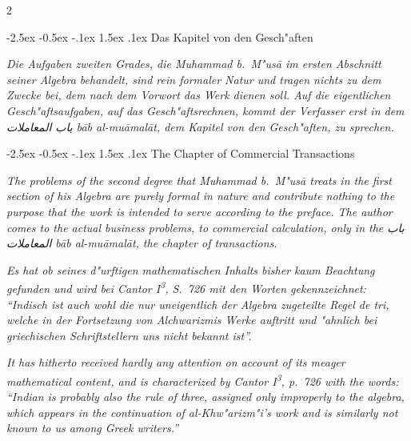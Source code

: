 \documentclass[10pt,a4paper]{article}
\makeatletter
\newcommand{\RL}[1]{\beginR#1\endR}
\newcommand{\ar}[1]{{\arabicfont\RL{#1}}}
\newcommand{\enquote}[1]{``#1''}
\renewcommand{\section}{\@startsection{section}{1}{\z@}%
  {-2.5ex \@plus -0.5ex \@minus -.1ex}%
  {1.5ex \@plus .1ex}%
  {\normalfont\large\bfseries\color{sectioncolor}}}
\makeatother
\begin{document}
\begin{paracol}{2}

\section{Das Kapitel von den Gesch"aften}

\textit{Die Aufgaben zweiten Grades, die Muhammad b.\ M"us\=a im ersten Abschnitt seiner Algebra behandelt, sind rein formaler Natur und tragen nichts zu dem Zwecke bei, dem nach dem Vorwort das Werk dienen soll. Auf die eigentlichen Gesch"aftsaufgaben, auf das Gesch"aftsrechnen, kommt der Verfasser erst in dem \ar{باب المعاملات} \textit{b\=ab al-mu\=amal\=at}, dem Kapitel von den Gesch"aften, zu sprechen.}

\switchcolumn

\section{The Chapter of Commercial Transactions}

\textit{The problems of the second degree that Muhammad b.\ M"us\=a treats in the first section of his Algebra are purely formal in nature and contribute nothing to the purpose that the work is intended to serve according to the preface. The author comes to the actual business problems, to commercial calculation, only in the \ar{باب المعاملات} \textit{b\=ab al-mu\=amal\=at}, the chapter of transactions.}

\switchcolumn*

\textit{Es hat ob seines d"urftigen mathematischen Inhalts bisher kaum Beachtung gefunden und wird bei Cantor I\textsuperscript{3}, S.\ 726 mit den Worten gekennzeichnet: \enquote{Indisch ist auch wohl die nur uneigentlich der Algebra zugeteilte Regel de tri, welche in der Fortsetzung von Alchwarizmis Werke auftritt und "ahnlich bei griechischen Schriftstellern uns nicht bekannt ist}.}

\switchcolumn

\textit{It has hitherto received hardly any attention on account of its meager mathematical content, and is characterized by Cantor I\textsuperscript{3}, p.\ 726 with the words: \enquote{Indian is probably also the rule of three, assigned only improperly to the algebra, which appears in the continuation of al-Khw"arizm"i's work and is similarly not known to us among Greek writers.}}


\end{paracol}
\end{document}
